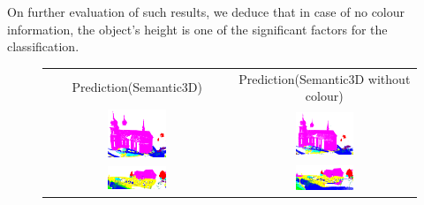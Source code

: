     On further evaluation of such results, we deduce that in case of no colour information, the object's height is one of the significant factors for the classification.
    \begin{figure}[h!]
        \centering
        \begin{tabular}{cc}
            Prediction(Semantic3D) & Prediction(Semantic3D without colour)\\
            \includegraphics[width=0.33\textwidth, height=0.175\textheight]{images/ood_imgs/de_sem3d/de_class_prob_1.pdf}&
            \includegraphics[width=0.33\textwidth, height=0.175\textheight]{images/sem3d_of/de_sem3d_of_1.pdf}\\

            \includegraphics[width=0.33\textwidth, height=0.175\textheight]{images/ood_imgs/de_sem3d/de_class_prob_2.pdf}&
            \includegraphics[width=0.33\textwidth, height=0.175\textheight]{images/sem3d_of/de_sem3d_of_2.pdf}\\


\end{tabular}
\end{figure}
